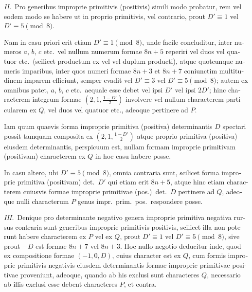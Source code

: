 \documentclass[12pt,a4paper]{article}
\theoremstyle{plain}
\theoremstyle{definition}
\theoremstyle{remark}
\begin{document}
\begin{otherlanguage}{latin}
\textit{II.}\ Pro generibus improprie primitivis (positivis) simili modo probatur, rem vel eodem modo se habere ut in proprio primitivis, vel contrario, prout $D' \equiv 1$ vel $D' \equiv 5 \pmod{8}$.

Nam in casu priori erit etiam $D' \equiv 1 \pmod{8}$, unde facile concluditur, inter numeros $a$, $b$, $c$ etc.\ vel nullum numerum formae $8n+5$ reperiri vel duos vel quatuor etc.\ (scilicet productum ex vel vel duplum producti), atque quotcunque numeris imparibus, inter quos numeri formae $8n+3$ et $8n+7$ coniunctim multitudinem imparem efficiunt, semper evadit vel $D' \equiv 3$ vel $D' \equiv 5 \pmod{8}$; autem ex omnibus patet, $a$, $b$, $c$ etc.\ aequale esse debet vel ipsi $D'$ vel ipsi $2D'$; hinc characterem integrum formae $(2, 1, \frac{1-D'}{2})$ involvere vel nullum characterem particularem ex $Q$, vel duos vel quatuor etc., adeoque pertinere ad $P$.

Iam quum quaevis forma improprie primitiva (positiva) determinantis $D$ spectari possit tamquam composita ex $(2, 1, \frac{1-D'}{2})$ atque proprio primitiva (positiva) eiusdem determinantis, perspicuum est, nullam formam improprie primitivam (positivam) characterem ex $Q$ in hoc casu habere posse.

In casu altero, ubi $D' \equiv 5 \pmod{8}$, omnia contraria sunt, scilicet forma improprie primitiva (positivam) det.\ $D'$ qui etiam erit $8n+5$, atque hinc etiam characterem cuiusvis formae improprie primitivae (pos.)\ det.\ $D$ pertinere ad $Q$, adeoque nulli characterum $P$ genus impr.\ prim.\ pos.\ respondere posse.

\textit{III.}\ Denique pro determinante negativo genera improprie primitiva negativa rursus contraria sunt generibus improprie primitivis positivis, scilicet illa non poterunt habere characterem ex $P$ vel ex $Q$, prout $D' \equiv 1$ vel $D' \equiv 5 \pmod{8}$, sive prout $-D$ est formae $8n+7$ vel $8n+3$. Hoc nullo negotio deducitur inde, quod ex compositione formae $(-1, 0, D)$, cuius character est ex $Q$, cum formis improprie primitivis negativis eiusdem determinantis formae improprie primitivae positivae proveniunt, adeoque, quando ab his exclusi sunt characteres $Q$, necessario ab illis exclusi esse debent characteres $P$, et contra.

\end{otherlanguage}
\end{document}
